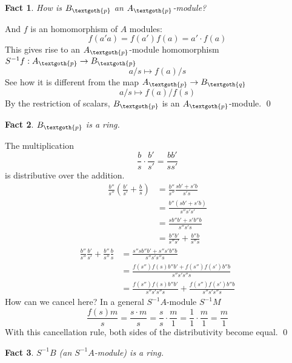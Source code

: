 \documentclass{article}
\newtheorem{theorem}{Fact}[section]
\begin{document}
\bigskip
\begin{theorem}
How is $B_\textgoth{p}$ an $A_\textgoth{p}$-module?
\end{theorem}

\noindent
And $f$ is an homomorphism of $A$ modules: \[ f(a'a) = f(a')f(a) = a' \cdot f(a) \] This gives rise to an $A_\textgoth{p}$-module homomorphism $S^{-1}f: A_\textgoth{p} \rightarrow B_\textgoth{p}$
\[
a/s \mapsto f(a)/s
\]
See how it is different from the map $A_\textgoth{p} \rightarrow B_\textgoth{q}$
\[
a/s \mapsto f(a)/f(s)
\]
By the restriction of scalars, $B_\textgoth{p}$ is an $A_\textgoth{p}$-module.
\qed

\bigskip
\begin{theorem}
$B_\textgoth{p}$ is a ring.
\end{theorem}

\noindent
The multiplication 
\[
\frac{b}{s} \cdot \frac{b'}{s'} = \frac{bb'}{ss'}
\]
is distributive over the addition.
\begin{equation*}
\begin{split}
\frac{b''}{s''} \left( \frac{b'}{s'} + \frac{b}{s} \right)
& = \frac{b''}{s''}\frac{sb' + s'b}{s's} \\
& = \frac{b''(sb' + s'b)}{s''s's'} \\
& = \frac{sb''b' + s'b''b}{s''s's} \\
& = \frac{b''b'}{s''s'} + \frac{b''b}{s''s}
\end{split}
\end{equation*}
\begin{equation*}
\begin{split}
\frac{b''}{s''} \frac{b'}{s'} + \frac{b''}{s''} \frac{b}{s}
& = \frac{s''sb''b' + s''s'b''b}{s''s's''s} \\
& = \frac{f(s'')f(s)b''b' + f(s'')f(s')b''b}{s''s's''s} \\
& = \frac{f(s'')f(s)b''b'}{s''s's''s} + \frac{f(s'')f(s')b''b}{s''s's''s}
\end{split}
\end{equation*}
How can we cancel here? In a general $S^{-1}A$-module $S^{-1}M$
\[
\frac{f(s)m}{s} = \frac{s \cdot m}{s} = \frac{s}{s} \cdot \frac{m}{1} = \frac{1}{1} \cdot \frac{m}{1} = \frac{m}{1}
\]
With this cancellation rule, both sides of the distributivity become equal.
\qed

\bigskip
\begin{theorem}
$S^{-1}B$ (an $S^{-1}A$-module)  is a ring.
\end{theorem}
\end{document}
